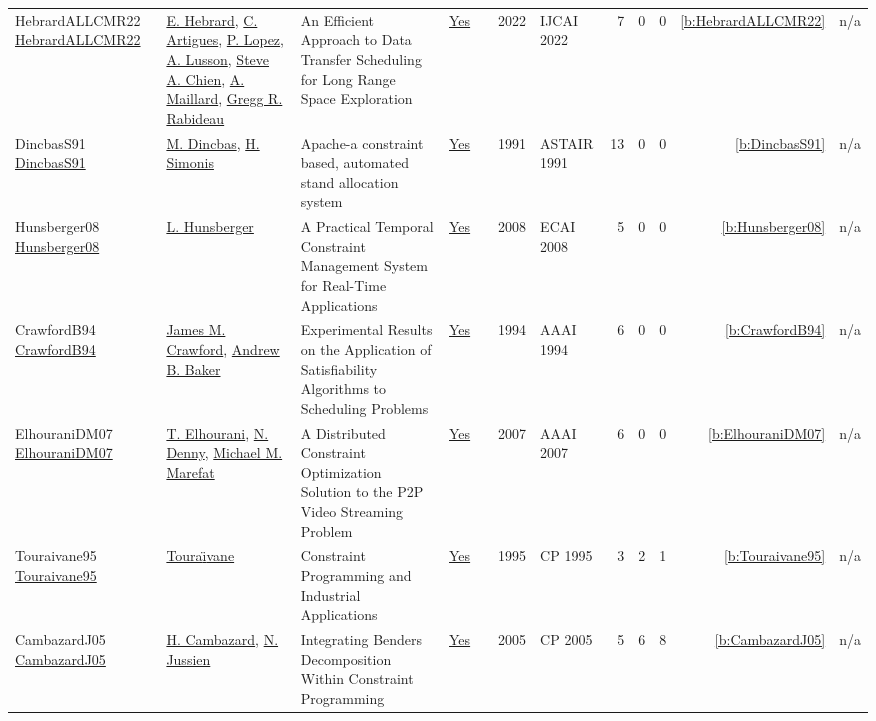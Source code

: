{\begin{longtable}{>{\raggedright\arraybackslash}p{3cm}>{\raggedright\arraybackslash}p{6cm}>{\raggedright\arraybackslash}p{6.5cm}rrrp{2.5cm}rrrrr}
HebrardALLCMR22 \href{https://doi.org/10.24963/ijcai.2022/643}{HebrardALLCMR22} & \hyperref[auth:a1]{E. Hebrard}, \hyperref[auth:a6]{C. Artigues}, \hyperref[auth:a3]{P. Lopez}, \hyperref[auth:a791]{A. Lusson}, \hyperref[auth:a792]{Steve A. Chien}, \hyperref[auth:a793]{A. Maillard}, \hyperref[auth:a794]{Gregg R. Rabideau} & An Efficient Approach to Data Transfer Scheduling for Long Range Space Exploration & \href{../works/HebrardALLCMR22.pdf}{Yes} & \cite{HebrardALLCMR22} & 2022 & IJCAI 2022 & 7 & 0 & 0 & \ref{b:HebrardALLCMR22} & n/a\\
DincbasS91 \href{}{DincbasS91} & \hyperref[auth:a723]{M. Dincbas}, \hyperref[auth:a17]{H. Simonis} & Apache-a constraint based, automated stand allocation system & \href{../works/DincbasS91.pdf}{Yes} & \cite{DincbasS91} & 1991 & ASTAIR 1991 & 13 & 0 & 0 & \ref{b:DincbasS91} & n/a\\
Hunsberger08 \href{https://doi.org/10.3233/978-1-58603-891-5-553}{Hunsberger08} & \hyperref[auth:a1293]{L. Hunsberger} & A Practical Temporal Constraint Management System for Real-Time Applications & \href{../works/Hunsberger08.pdf}{Yes} & \cite{Hunsberger08} & 2008 & ECAI 2008 & 5 & 0 & 0 & \ref{b:Hunsberger08} & n/a\\
CrawfordB94 \href{http://www.aaai.org/Library/AAAI/1994/aaai94-168.php}{CrawfordB94} & \hyperref[auth:a1301]{James M. Crawford}, \hyperref[auth:a1302]{Andrew B. Baker} & Experimental Results on the Application of Satisfiability Algorithms to Scheduling Problems & \href{../works/CrawfordB94.pdf}{Yes} & \cite{CrawfordB94} & 1994 & AAAI 1994 & 6 & 0 & 0 & \ref{b:CrawfordB94} & n/a\\
ElhouraniDM07 \href{http://www.aaai.org/Library/AAAI/2007/aaai07-213.php}{ElhouraniDM07} & \hyperref[auth:a1367]{T. Elhourani}, \hyperref[auth:a1368]{N. Denny}, \hyperref[auth:a1369]{Michael M. Marefat} & A Distributed Constraint Optimization Solution to the {P2P} Video Streaming Problem & \href{../works/ElhouraniDM07.pdf}{Yes} & \cite{ElhouraniDM07} & 2007 & AAAI 2007 & 6 & 0 & 0 & \ref{b:ElhouraniDM07} & n/a\\
Touraivane95 \href{https://doi.org/10.1007/3-540-60299-2_41}{Touraivane95} & \hyperref[auth:a308]{Toura{\"{\i}}vane} & Constraint Programming and Industrial Applications & \href{../works/Touraivane95.pdf}{Yes} & \cite{Touraivane95} & 1995 & CP 1995 & 3 & 2 & 1 & \ref{b:Touraivane95} & n/a\\
CambazardJ05 \href{https://doi.org/10.1007/11564751_58}{CambazardJ05} & \hyperref[auth:a1011]{H. Cambazard}, \hyperref[auth:a249]{N. Jussien} & Integrating Benders Decomposition Within Constraint Programming & \href{../works/CambazardJ05.pdf}{Yes} & \cite{CambazardJ05} & 2005 & CP 2005 & 5 & 6 & 8 & \ref{b:CambazardJ05} & n/a\\
\end{longtable}
}

